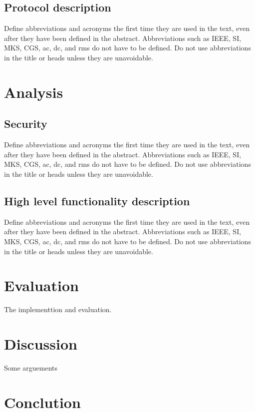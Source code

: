 \documentclass[conference]{IEEEtran}
\begin{document}
\subsection{Protocol description}

Define abbreviations and acronyms the first time they are used in the text, 
even after they have been defined in the abstract. Abbreviations such as 
IEEE, SI, MKS, CGS, ac, dc, and rms do not have to be defined. Do not use 
abbreviations in the title or heads unless they are unavoidable.

\section{Analysis}

\subsection{Security}

Define abbreviations and acronyms the first time they are used in the text, 
even after they have been defined in the abstract. Abbreviations such as 
IEEE, SI, MKS, CGS, ac, dc, and rms do not have to be defined. Do not use 
abbreviations in the title or heads unless they are unavoidable.

\subsection{High level functionality description}

Define abbreviations and acronyms the first time they are used in the text, 
even after they have been defined in the abstract. Abbreviations such as 
IEEE, SI, MKS, CGS, ac, dc, and rms do not have to be defined. Do not use 
abbreviations in the title or heads unless they are unavoidable.

\section{Evaluation}

The implementtion and evaluation.

\section{Discussion}

Some arguements

\section{Conclution}
\end{document}
